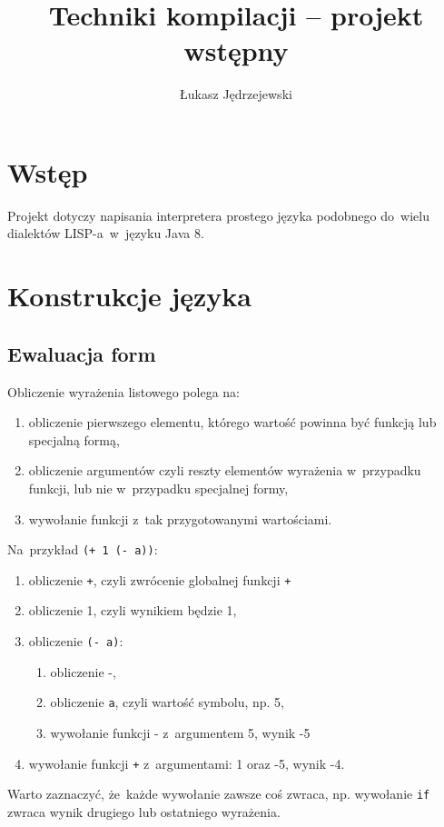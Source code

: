 \documentclass[a4paper,11pt]{article}
\author{Łukasz Jędrzejewski}
\title{Techniki kompilacji -- projekt wstępny}
\date{}
\begin{document}
\maketitle

\section{Wstęp}

Projekt dotyczy napisania interpretera prostego języka podobnego do~wielu
dialektów LISP-a~w~języku Java 8.

\section{Konstrukcje języka}

\subsection{Ewaluacja form}

Obliczenie wyrażenia listowego polega na:
\begin{enumerate}
\item obliczenie pierwszego elementu, którego wartość powinna być funkcją lub
  specjalną formą,
\item obliczenie argumentów czyli reszty elementów wyrażenia w~przypadku
  funkcji, lub nie w~przypadku specjalnej formy,
\item wywołanie funkcji z~tak przygotowanymi wartościami.
\end{enumerate}

Na~przykład \verb|(+ 1 (- a))|:
\begin{enumerate}
\item obliczenie \verb|+|, czyli zwrócenie globalnej funkcji \verb|+|
\item obliczenie 1, czyli wynikiem będzie 1,
\item obliczenie \verb+(- a)+:
  \begin{enumerate}
  \item obliczenie -,
  \item obliczenie \verb+a+, czyli wartość symbolu, np. 5,
  \item wywołanie funkcji - z~argumentem 5, wynik -5
  \end{enumerate}
\item wywołanie funkcji \verb|+| z~argumentami: 1 oraz -5, wynik -4.
\end{enumerate}

Warto zaznaczyć, że~każde wywołanie zawsze coś zwraca, np. wywołanie \verb+if+
zwraca wynik drugiego lub ostatniego wyrażenia.
\end{document}
